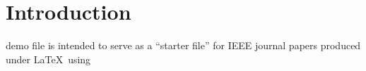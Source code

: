 \section{Introduction}
 demo file is intended to serve as a ``starter file''
for IEEE journal papers produced under \LaTeX\ using